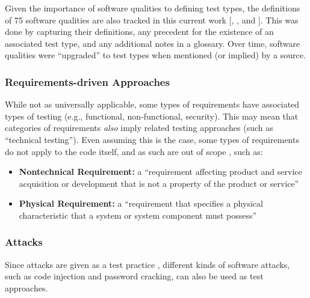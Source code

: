\discrepsTable{}

Given the importance of software qualities to defining test types, the
definitions of 75 software qualities are also tracked in this current work%
[, , and ].
This was done by capturing their definitions, any precedent for the existence
of an associated test type, and any additional notes in a glossary. Over time,
software qualities were ``upgraded''
to test types when mentioned (or implied) by a source.

\subsubsection{Requirements-driven Approaches}
While not as universally applicable, some types of requirements have associated
types of testing (e.g., functional, non-functional, security). This may mean
that categories of requirements \emph{also} imply related testing approaches
(such as ``technical testing''). \ifnotpaper Even assuming this is the case, some types of
      requirements do not apply to the code itself, and as such are out of scope%
      , such as:
      \begin{itemize}
            \item \textbf{Nontechnical Requirement:} a ``requirement affecting product
                  and service acquisition or development that is not a property of
                  the product or service'' \citep[p.~293]{IEEE2017}
            \item \textbf{Physical Requirement:} a ``requirement that specifies a
                  physical characteristic that a system or system component must
                  possess'' \citep[p.~322]{IEEE2017}
      \end{itemize}
\fi

\subsubsection{Attacks}
\label{attacks}
Since attacks are given as a test practice \citep[p.~34]{IEEE2022}, different
kinds of software attacks, such as code injection and password cracking, can
also be used as test approaches.

